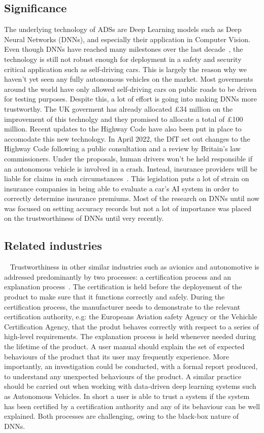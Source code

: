 \documentclass[a4paper]{article}
\begin{document}
  \subsection{Significance}
  The underlying technology of ADSs are Deep Learning models such as Deep Neural Networks (DNNs), and especially their application in Computer Vision. Even though DNNs have reached many milestones over the last decade~\cite{goodfellow2014generative,meed2020}, the technology is still not robust enough for deployment in a safety and security critical application such as self-driving cars. This is largely the reason why we haven't yet seen any fully autonomous vehicles on the market. Most goverments around the world have only allowed self-driving cars on public roads to be driven for testing purposes. Despite this, a lot of effort is going into making DNNs more trustworthy. The UK goverment has already allocated £34 million on the improvement of this technolgy and they promised to allocate a total of £100 million. Recent updates to the Highway Code have also been put in place to accomodate this new technology. In April 2022, the DfT set out changes to the Highway Code following a public consultation and a review by Britain's law commissioners. Under the proposals, human drivers won't be held responsible if an autonomous vehicle is involved in a crash. Instead, insurance providers will be liable for claims in such circumstances~\cite{uk_gov_2020}.
  This legislation puts a lot of strain on insurance companies in being able to evaluate a car's AI system in order to correctly determine insurance premiums.
  Most of the research on DNNs until now was focused on setting accuracy records but not a lot of importance was placed on the trustworthiness of DNNs until very recently.
  \subsection{Related industries}~\label{sec:related-industries}
  Trustworthiness in other similar industries such as avionics and autonomotive is addressed predominantly by two processes: a certification process and an explanation process~\cite{huang2020survey}. The certification is held before the deployement of the product to make sure that it functions correctly and safely. During the certification process, the manufacturer needs to demonstrate to the relevant certification authority, e.g: the Europeans Aviation safety Agency or the Vehichle Certification Agency, that the produt behaves correctly with respect to a series of high-level requirements. The explanation process is held whenever needed during the lifetime of the product. A user manual should explain the set of expected behaviours of the product that its user may frequently experience. More importantly, an investigation could be conducted, with a formal report produced, to understand any unexpected behaviours of the product. A similar practice should be carried out when working with data-driven deep learning systems such as Autonomous Vehicles. In short a user is able to trust a system if the system has been certified by a certification authority and any of its behaviour can be well explained. Both processes are challenging, owing to the black-box nature of DNNs.
\end{document}
